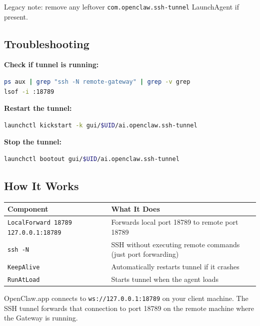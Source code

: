 Legacy note: remove any leftover \texttt{com.openclaw.ssh-tunnel} LaunchAgent if present.

\hrulefill


\subsection{Troubleshooting}


\textbf{Check if tunnel is running:}

\begin{lstlisting}[language=bash]
ps aux | grep "ssh -N remote-gateway" | grep -v grep
lsof -i :18789
\end{lstlisting}


\textbf{Restart the tunnel:}

\begin{lstlisting}[language=bash]
launchctl kickstart -k gui/$UID/ai.openclaw.ssh-tunnel
\end{lstlisting}


\textbf{Stop the tunnel:}

\begin{lstlisting}[language=bash]
launchctl bootout gui/$UID/ai.openclaw.ssh-tunnel
\end{lstlisting}


\hrulefill


\subsection{How It Works}



\begin{table}[h]
\centering
\small
\begin{tabular}{|l|l|}
\hline
Component & What It Does \\
\hline
\texttt{LocalForward 18789 127.0.0.1:18789} & Forwards local port 18789 to remote port 18789 \\
\hline
\texttt{ssh -N} & SSH without executing remote commands (just port forwarding) \\
\hline
\texttt{KeepAlive} & Automatically restarts tunnel if it crashes \\
\hline
\texttt{RunAtLoad} & Starts tunnel when the agent loads \\
\hline
\end{tabular}
\end{table}



OpenClaw.app connects to \texttt{ws://127.0.0.1:18789} on your client machine. The SSH tunnel forwards that connection to port 18789 on the remote machine where the Gateway is running.


